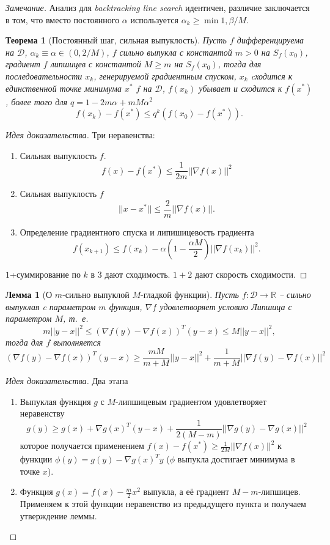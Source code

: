\documentclass[10pt,a4paper]{article}
\newtheorem{theorem_ru}{Теорема}[section]
\newtheorem{lemma_ru}{Лемма}[section]
\newenvironment{sketch}
    {\begin{proof}[Идея доказательства]
    }
    { 
    \end{proof}
    }
\begin{document}
\textit{Замечание.} Анализ для \textit{backtracking line search} идентичен, различие заключается в том, что вместо постоянного $\alpha$ используется $\alpha_k\geq \min{1, \beta / M}$.

\begin{theorem_ru}[Постоянный шаг, сильная выпуклость] Пусть $f$ дифференцируема на $\mathcal{D}$, $\alpha_k\equiv \alpha\in (0, 2/M)$, $f$ сильно выпукла с константой $m>0$ на $S_f(x_0)$, градиент $f$ липшицев с константой $M\geq m$ на $S_f(x_0)$, тогда для последовательности $x_k$, генерируемой градиентным спуском,
$x_k$ cходится к единственной точке минимума $x^*$ $f$ на $\mathcal{D}$, $f(x_k)$ убывает и сходится к $f(x^*)$, более того для $q=1-2m\alpha+mM\alpha^2$
$$
f(x_k)-f(x^*)\leq q^k(f(x_0)-f(x^*)).
$$
\end{theorem_ru}

\begin{sketch}
Три неравенства:
\begin{enumerate}
\item Сильная выпуклость $f$.
$$
f(x)-f(x^*)\leq \frac{1}{2m}||\nabla f(x)||^2
$$
\item Сильная выпуклость $f$
$$
||x-x^*||\leq \frac{2}{m}||\nabla f(x)||.
$$
\item Определение градиентного спуска и липишицевость градиента 
$$
f(x_{k+1})\leq f(x_k)-\alpha\left(1-\frac{\alpha M}{2}\right)||\nabla f(x_k)||^2.
$$
\end{enumerate}
$1$+суммирование по $k$ в $3$ дают сходимость. $1+2$ дают скорость сходимости.
\end{sketch}

\begin{lemma_ru}[О $m$-сильно выпуклой $M$-гладкой функции]
Пусть $f:\mathcal{D}\rightarrow \mathbb{R}$ -- сильно выпуклая c параметром $m$ функция, $\nabla f$ удовлетворяет условию
Липшица с параметром $M$, т.~е.
$$
m||y-x||^2\leq (\nabla f(y)-\nabla f(x))^T(y-x)\leq M||y-x||^2,
$$
тогда для $f$ выполняется
$$
(\nabla f(y)-\nabla f(x))^T(y-x)\geq \frac{mM}{m+M}||y-x||^2+\frac{1}{m+M}||\nabla f(y)-\nabla f(x)||^2
$$
\end{lemma_ru}
\begin{sketch}
Два этапа
\begin{enumerate}
\item Выпуклая функция $g$ с $M$-липшицевым градиентом удовлетворяет неравенству
$$
g(y)\geq g(x)+\nabla g(x)^T(y-x)+\frac{1}{2(M-m)}||\nabla g(y)-\nabla g(x)||^2
$$
которое получается применением $f(x)-f(x^*)\geq \frac{1}{2M}||\nabla f(x)||^2$ к функции $\phi(y)=g(y)-\nabla g(x)^Ty$ ($\phi$ выпукла достигает минимума в точке $x$).
\item Функция $g(x)=f(x)-\frac{m}{2}x^2$ выпукла, а её градиент $M-m$-липшицев. Применяем к этой функции неравенство из предыдущего пункта и получаем утверждение леммы.
\end{enumerate}
\end{sketch}
\end{document}
